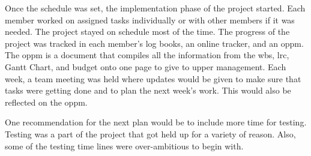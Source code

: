 Once the schedule was set, the implementation phase of the project started. 
Each member worked on assigned tasks individually or with other members if it was needed.
The project stayed on schedule most of the time.
The progress of the project was tracked in each member's log books, an online tracker, and an \gls{oppm}.
The \gls{oppm} is a document that compiles all the information from the \gls{wbs}, \gls{lrc}, Gantt Chart, and budget onto one page to give to upper management.
Each week, a team meeting was held where updates would be given to make sure that tasks were getting done and to plan the next week's work.
This would also be reflected on the \gls{oppm}.

One recommendation for the next plan would be to include more time for testing. 
Testing was a part of the project that got held up for a variety of reason.
Also, some of the testing time lines were over-ambitious to begin with.
